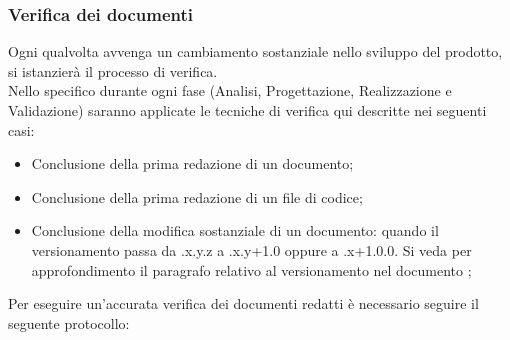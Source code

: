 	\subsubsection{Verifica dei documenti}
	\label{sec:VerificaDocumenti}
	Ogni qualvolta avvenga un cambiamento sostanziale nello sviluppo del prodotto, si istanzierà il processo di verifica. \\
		Nello specifico durante ogni fase (Analisi, Progettazione, Realizzazione e Validazione) saranno applicate le tecniche di verifica qui descritte nei seguenti casi:
		\begin{itemize}
			\item Conclusione della prima redazione di un documento;
			\item Conclusione della prima redazione di un file\ped{g} di codice;
			\item Conclusione della modifica sostanziale di un documento: quando il versionamento passa da .x.y.z a .x.y+1.0 oppure a .x+1.0.0. Si veda per approfondimento il paragrafo relativo al versionamento nel documento \href{run:../../Esterni/\fNormeDiProgetto}{\fEscapeNormeDiProgetto};

		\end{itemize}
	Per eseguire un'accurata verifica dei documenti redatti è necessario seguire il seguente protocollo:
